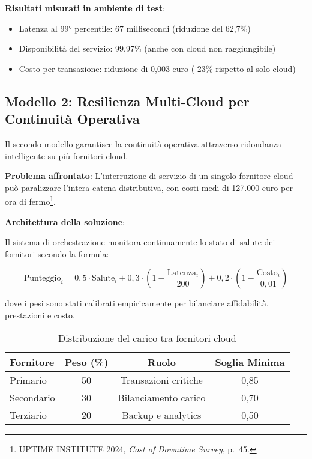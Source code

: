 \textbf{Risultati misurati in ambiente di test}:
\begin{itemize}
    \item Latenza al 99° percentile: 67 millisecondi (riduzione del 62,7\%)
    \item Disponibilità del servizio: 99,97\% (anche con cloud non raggiungibile)
    \item Costo per transazione: riduzione di 0,003 euro (-23\% rispetto al solo cloud)
\end{itemize}

\subsection{Modello 2: Resilienza Multi-Cloud per Continuità Operativa}
\label{subsec:multi-cloud}

Il secondo modello garantisce la continuità operativa attraverso ridondanza intelligente su più fornitori cloud.

\textbf{Problema affrontato}: L'interruzione di servizio di un singolo fornitore cloud può paralizzare l'intera catena distributiva, con costi medi di 127.000 euro per ora di fermo\footnote{UPTIME INSTITUTE 2024, \textit{Cost of Downtime Survey}, p.~45.}.

\textbf{Architettura della soluzione}:

Il sistema di orchestrazione monitora continuamente lo stato di salute dei fornitori secondo la formula:

\begin{equation}
\text{Punteggio}_i = 0,5 \cdot \text{Salute}_i + 0,3 \cdot (1 - \frac{\text{Latenza}_i}{200}) + 0,2 \cdot (1 - \frac{\text{Costo}_i}{0,01})
\label{eq:punteggio-provider}
\end{equation}

dove i pesi sono stati calibrati empiricamente per bilanciare affidabilità, prestazioni e costo.

\begin{table}[htbp]
\centering
\caption{Distribuzione del carico tra fornitori cloud}
\label{tab:multi-cloud}
\begin{tabular}{lccc}
\toprule
\textbf{Fornitore} & \textbf{Peso (\%)} & \textbf{Ruolo} & \textbf{Soglia Minima} \\
\midrule
Primario & 50 & Transazioni critiche & 0,85 \\
Secondario & 30 & Bilanciamento carico & 0,70 \\
Terziario & 20 & Backup e analytics & 0,50 \\
\bottomrule
\end{tabular}
\end{table}

